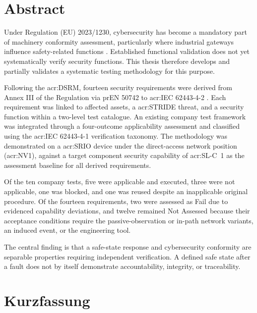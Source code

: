 \chapter*{Abstract} %

Under Regulation (EU) 2023/1230, cybersecurity has become a mandatory part of machinery conformity assessment, particularly where industrial gateways influence safety-related functions \cite[p. 4]{EU2023_1230}. Established functional validation does not yet systematically verify security functions. This thesis therefore develops and partially validates a systematic testing methodology for this purpose.

Following the \gls{acr:DSRM}, fourteen security requirements were derived from Annex III of the Regulation via prEN 50742 to \acrshort{acr:IEC} 62443-4-2 . Each requirement was linked to affected assets, a \acrshort{acr:STRIDE} threat, and a security function within a two-level test catalogue. An existing company test framework was integrated through a four-outcome applicability assessment and classified using the \acrshort{acr:IEC} 62443-4-1 verification taxonomy. The methodology was demonstrated on a \gls{acr:SRIO} device under the direct-access network position (\acrshort{acr:NV1}), against a target component security capability of \acrshort{acr:SL-C}~1 as the assessment baseline for all derived requirements.

Of the ten company tests, five were applicable and executed, three were not applicable, one was blocked, and one was reused despite an inapplicable original procedure. Of the fourteen requirements, two were assessed as Fail due to evidenced capability deviations, and twelve remained Not Assessed because their acceptance conditions require the passive-observation or in-path network variants, an induced event, or the engineering tool.

The central finding is that a safe-state response and cybersecurity conformity are separable properties requiring independent verification. A defined safe state after a fault does not by itself demonstrate accountability, integrity, or traceability.

\clearpage

\chapter*{Kurzfassung} %

